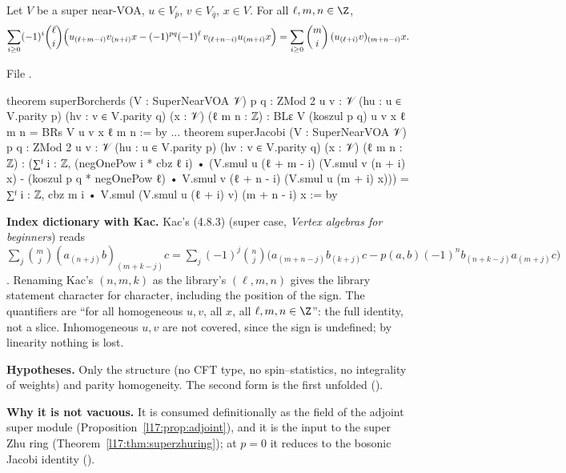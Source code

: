 \begin{theorem}\label{l17:thm:superjacobi}
Let $V$ be a super near-VOA, $u\in V_{\bar p}$, $v\in V_{\bar q}$, $x\in V$. For all $\ell,m,n\in\Z$,
\begin{equation*}
\sum_{i\ge0}(-1)^i\binom{\ell}{i}\Bigl(u_{(\ell+m-i)}v_{(n+i)}x
-(-1)^{pq}(-1)^\ell\,v_{(\ell+n-i)}u_{(m+i)}x\Bigr)
=\sum_{i\ge0}\binom mi\,(u_{(\ell+i)}v)_{(m+n-i)}x .
\end{equation*}
\end{theorem}
\noindent File .
\begin{leancode}
theorem superBorcherds (V : SuperNearVOA 𝒱) {p q : ZMod 2} {u v : 𝒱} (hu : u ∈ V.parity p)
    (hv : v ∈ V.parity q) (x : 𝒱) (ℓ m n : ℤ) :
    BLε V (koszul p q) u v x ℓ m n = BRs V u v x ℓ m n := by
...
theorem superJacobi (V : SuperNearVOA 𝒱) {p q : ZMod 2} {u v : 𝒱} (hu : u ∈ V.parity p)
    (hv : v ∈ V.parity q) (x : 𝒱) (ℓ m n : ℤ) :
    (∑ᶠ i : ℤ, (negOnePow i * cbz ℓ i) •
        (V.smul u (ℓ + m - i) (V.smul v (n + i) x)
          - (koszul p q * negOnePow ℓ) • V.smul v (ℓ + n - i) (V.smul u (m + i) x)))
      = ∑ᶠ i : ℤ, cbz m i • V.smul (V.smul u (ℓ + i) v) (m + n - i) x := by
\end{leancode}
\begin{dictionary}
\textbf{Index dictionary with Kac.} Kac's (4.8.3) (super case, \emph{Vertex algebras for
beginners}) reads
$\sum_j\binom mj(a_{(n+j)}b)_{(m+k-j)}c=\sum_j(-1)^j\binom nj\bigl(a_{(m+n-j)}b_{(k+j)}c-p(a,b)(-1)^nb_{(n+k-j)}a_{(m+j)}c\bigr)$.
Renaming Kac's $(n,m,k)$ as the library's $(\ell,m,n)$ gives the library statement character for
character, including the position of the sign. The quantifiers are ``for all homogeneous $u,v$, all
$x$, all $\ell,m,n\in\Z$'': the full identity, not a slice. Inhomogeneous $u,v$ are not covered,
since the sign is undefined; by linearity nothing is lost.

\textbf{Hypotheses.} Only the structure  (no CFT type, no spin--statistics, no
integrality of weights) and parity homogeneity. The second form is the first unfolded
().

\textbf{Why it is not vacuous.} It is consumed definitionally as the  field of the adjoint
super module (Proposition~\ref{l17:prop:adjoint}), and it is the input to the super Zhu ring
(Theorem~\ref{l17:thm:superzhuring}); at $p=0$ it reduces to the bosonic Jacobi identity
().
\end{dictionary}
